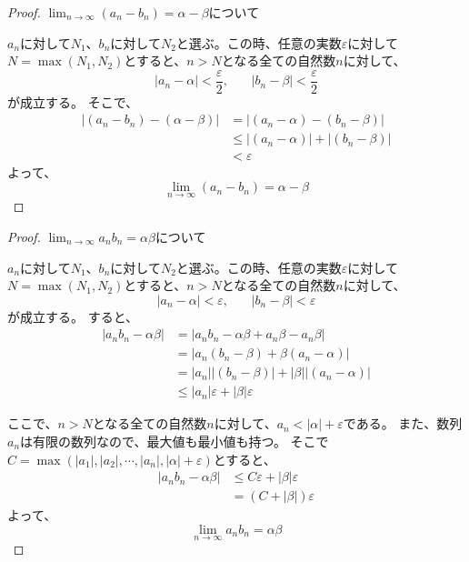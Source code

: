 \documentclass[a4paper,16pt]{jsarticle}
\newtheorem{proof}{証明}
\begin{document}
{\begin{proof}{$\lim_{n \to \infty} (a_n - b_n) = \alpha - \beta$について}

$a_n$に対して$N_1$、$b_n$に対して$N_2$と選ぶ。この時、任意の実数$\varepsilon$に対して$N = \max(N_1,N_2)$とすると、$n>N$となる全ての自然数$n$に対して、
\begin{equation}
	|a_n - \alpha| < \dfrac{\varepsilon}{2}, ~~~~~~~~ |b_n - \beta| < \dfrac{\varepsilon}{2}
\end{equation}
が成立する。
そこで、
\begin{align}
	|(a_n - b_n) - (\alpha - \beta)|
	&= |(a_n - \alpha) - (b_n - \beta)| \\
	&\leq |(a_n - \alpha)| + |(b_n - \beta)| \\
	&< \varepsilon
\end{align}
よって、
\begin{equation}
	\lim_{n \to \infty} (a_n - b_n) = \alpha - \beta
\end{equation}
\end{proof}

\begin{proof}{$\lim_{n \to \infty} a_nb_n = \alpha\beta$について}

	$a_n$に対して$N_1$、$b_n$に対して$N_2$と選ぶ。この時、任意の実数$\varepsilon$に対して$N = \max(N_1,N_2)$とすると、$n>N$となる全ての自然数$n$に対して、
	\begin{equation}
		|a_n - \alpha| < \varepsilon, ~~~~~~~~ |b_n - \beta| < \varepsilon
	\end{equation}
	が成立する。
	すると、
	\begin{align}
		|a_nb_n - \alpha\beta| &= |a_nb_n - \alpha\beta + a_n\beta - a_n\beta| \\
		&= |a_n(b_n - \beta) + \beta(a_n - \alpha)| \\
		&= |a_n||(b_n - \beta)| + |\beta||(a_n - \alpha)| \\
		&\leq |a_n|\varepsilon + |\beta|\varepsilon
	\end{align}

	ここで、$n>N$となる全ての自然数$n$に対して、$a_n < |\alpha| + \varepsilon$である。
	また、数列$a_n$は有限の数列なので、最大値も最小値も持つ。
	そこで$C = \max(|a_1|,|a_2|,\cdots,|a_n|,|\alpha|+\varepsilon)$とすると、
	\begin{align}
		|a_nb_n - \alpha\beta| &\leq C\varepsilon + |\beta|\varepsilon \\
		&= (C + |\beta|)\varepsilon
	\end{align}
	よって、
	\begin{equation}
		\lim_{n \to \infty} a_nb_n = \alpha\beta
	\end{equation}
\end{proof}

}
\end{document}
